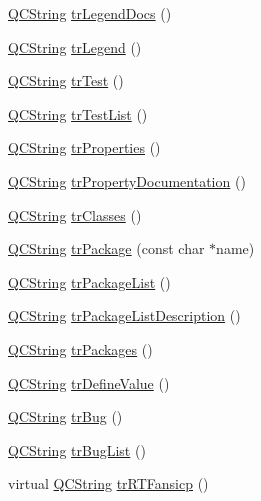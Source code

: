 \begin{DoxyCompactItemize}
\item 
\hyperlink{class_q_c_string}{Q\+C\+String} \hyperlink{class_translator_dutch_a7e0e4b56a867fa4af556b2bb8677a62d}{tr\+Legend\+Docs} ()
\item 
\hyperlink{class_q_c_string}{Q\+C\+String} \hyperlink{class_translator_dutch_a3767a87324b1f75b42cf70072625cb55}{tr\+Legend} ()
\item 
\hyperlink{class_q_c_string}{Q\+C\+String} \hyperlink{class_translator_dutch_a06afe7808d93f5c37219cc9853bb0cfe}{tr\+Test} ()
\item 
\hyperlink{class_q_c_string}{Q\+C\+String} \hyperlink{class_translator_dutch_a1b28f1d7fb1f18e4140a49dce53ce130}{tr\+Test\+List} ()
\item 
\hyperlink{class_q_c_string}{Q\+C\+String} \hyperlink{class_translator_dutch_a5634a2d94a9f2aef3b38e5e0ec91db0f}{tr\+Properties} ()
\item 
\hyperlink{class_q_c_string}{Q\+C\+String} \hyperlink{class_translator_dutch_ad58c7ae26a75336f2a67eabfc3858389}{tr\+Property\+Documentation} ()
\item 
\hyperlink{class_q_c_string}{Q\+C\+String} \hyperlink{class_translator_dutch_aa31c2428cf745783fb68b73ad270dc58}{tr\+Classes} ()
\item 
\hyperlink{class_q_c_string}{Q\+C\+String} \hyperlink{class_translator_dutch_aaec0a1183dccae376b65520e85389ac4}{tr\+Package} (const char $\ast$name)
\item 
\hyperlink{class_q_c_string}{Q\+C\+String} \hyperlink{class_translator_dutch_a2c00c3631db34456fedcb30e0155868e}{tr\+Package\+List} ()
\item 
\hyperlink{class_q_c_string}{Q\+C\+String} \hyperlink{class_translator_dutch_a498b5392e984f25b4caf489883159ea9}{tr\+Package\+List\+Description} ()
\item 
\hyperlink{class_q_c_string}{Q\+C\+String} \hyperlink{class_translator_dutch_a62e097fe0af07f5f470df1f8cf367a83}{tr\+Packages} ()
\item 
\hyperlink{class_q_c_string}{Q\+C\+String} \hyperlink{class_translator_dutch_aba057ef360f8d5f2c47713924302bec2}{tr\+Define\+Value} ()
\item 
\hyperlink{class_q_c_string}{Q\+C\+String} \hyperlink{class_translator_dutch_add919f86916e0494e966a4637a0ab19e}{tr\+Bug} ()
\item 
\hyperlink{class_q_c_string}{Q\+C\+String} \hyperlink{class_translator_dutch_a243e10d7ef2cb19180708078b93ed1fb}{tr\+Bug\+List} ()
\item 
virtual \hyperlink{class_q_c_string}{Q\+C\+String} \hyperlink{class_translator_dutch_ae0b6e77d800b7a57e9b17f689fb81771}{tr\+R\+T\+Fansicp} ()

\end{DoxyCompactItemize}
